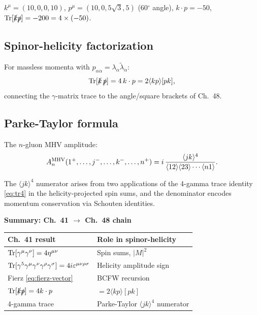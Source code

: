 \begin{mdframed}[backgroundcolor=green!5]
$k^\mu=(10,0,0,10)$, $p^\mu=(10,0,5\sqrt{3},5)$ (60${}^\circ$ angle),
$k\cdot p = -50$, $\operatorname{Tr}[\slashed{k}\slashed{p}] = -200 = 4\times(-50)$. \checkmark
\end{mdframed}

\subsection{Spinor-helicity factorization}

For massless momenta with $p_{\alpha\dot\alpha}=\lambda_\alpha\tilde\lambda_{\dot\alpha}$:
\begin{equation}
  \operatorname{Tr}[\slashed{k}\,\slashed{p}] = 4\,k\cdot p = 2\langle kp\rangle[pk],
\end{equation}
connecting the $\gamma$-matrix trace to the angle/square brackets of Ch.~48.

\subsection{Parke-Taylor formula}

The $n$-gluon MHV amplitude:
\begin{equation}\label{eq:parke-taylor}
  A_n^{\rm MHV}(1^+,\ldots,j^-,\ldots,k^-,\ldots,n^+)
  = i\,\frac{\langle jk\rangle^4}{\langle12\rangle\langle23\rangle\cdots\langle n1\rangle}.
\end{equation}

The $\langle jk\rangle^4$ numerator arises from two applications of the
4-gamma trace identity \eqref{eq:tr4} in the helicity-projected spin sums,
and the denominator encodes momentum conservation via Schouten identities.

\begin{mdframed}[backgroundcolor=blue!5]
\textbf{Summary: Ch.~41 $\to$ Ch.~48 chain}
\begin{center}
\begin{tabular}{ll}
\toprule
Ch.~41 result & Role in spinor-helicity \\
\midrule
$\operatorname{Tr}[\gamma^\mu\gamma^\nu]=4\eta^{\mu\nu}$ & Spin sums, $|M|^2$ \\
$\operatorname{Tr}[\gamma^5\gamma^\mu\gamma^\nu\gamma^\rho\gamma^\sigma]=4i\varepsilon^{\mu\nu\rho\sigma}$ & Helicity amplitude sign \\
Fierz \eqref{eq:fierz-vector} & BCFW recursion \\
$\operatorname{Tr}[\slashed{k}\slashed{p}]=4k\cdot p$ & $= 2\langle kp\rangle[pk]$ \\
4-gamma trace & Parke-Taylor $\langle jk\rangle^4$ numerator \\
\bottomrule
\end{tabular}
\end{center}
\end{mdframed}

\vfill
